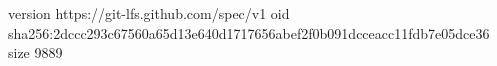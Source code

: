 version https://git-lfs.github.com/spec/v1
oid sha256:2dccc293c67560a65d13e640d1717656abef2f0b091dcceacc11fdb7e05dce36
size 9889
